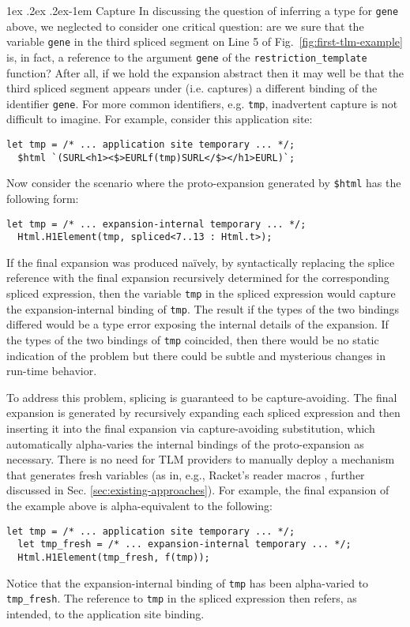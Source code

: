 \documentclass[acmsmall]{acmart}
\makeatletter
\renewcommand{\subsubsection}{%
  \@startsection{subsubsection}{3}%
  {\z@}{1ex \@plus .2ex \@minus .2ex}{-1em}%
  {\normalfont\normalsize\bfseries}%
}
\newcommand{\li}[1]{\lstinline[basicstyle=\ttfamily\fontsize{9pt}{1em}\selectfont]{#1}}
\makeatother
\begin{document}
\subsubsection{Capture}
In discussing the question of inferring a type for \li{gene} above, we neglected to consider one critical question: are we sure that the variable \li{gene} in the third spliced segment on Line 5 of Fig.~\ref{fig:first-tlm-example} is, in fact, a reference to the argument \li{gene} of the \li{restriction_template} function? After all, if we hold the expansion abstract then it may well be that the third spliced segment appears under (i.e. captures) a different binding of the identifier \li{gene}. For more common identifiers, e.g. \li{tmp}, inadvertent capture is not difficult to imagine. For example, consider this application site:
\begin{lstlisting}[numbers=none]
  let tmp = /* ... application site temporary ... */;
  $html `(SURL<h1><$>EURLf(tmp)SURL</$></h1>EURL)`;
\end{lstlisting}
Now consider the scenario where the proto-expansion generated by \li{$html} has the following form:
\begin{lstlisting}[numbers=none]
  let tmp = /* ... expansion-internal temporary ... */;
  Html.H1Element(tmp, spliced<7..13 : Html.t>);
\end{lstlisting}
If the final expansion was produced na\"ively, by syntactically replacing the splice reference with the final expansion recursively determined for the corresponding spliced expression, then the  variable \li{tmp} in the spliced expression would capture the expansion-internal binding of \li{tmp}. The result if the types of the two bindings differed would be a type error exposing the internal details of the expansion. If the types of the two bindings of \li{tmp} coincided, then there would be no static indication of the problem but there could be subtle and mysterious changes in run-time behavior. %

To address this problem, splicing is guaranteed to be capture-avoiding. The final expansion is generated by recursively expanding each spliced expression and then inserting it into the final expansion via capture-avoiding substitution, which automatically alpha-varies the internal bindings of the proto-expansion as necessary. There is no need for TLM providers to manually deploy a mechanism that generates fresh variables (as in, e.g., Racket's reader macros \cite{Flatt:2012:CLR:2063176.2063195}, further discussed in Sec. \ref{sec:existing-approaches}). For example, the final expansion of the example above is alpha-equivalent to the following:
\begin{lstlisting}[numbers=none]
  let tmp = /* ... application site temporary ... */; 
  let tmp_fresh = /* ... expansion-internal temporary ... */;
  Html.H1Element(tmp_fresh, f(tmp));
\end{lstlisting}
Notice that the expansion-internal binding of \li{tmp} has been alpha-varied to \li{tmp_fresh}. The reference to \li{tmp} in the spliced expression then refers, as intended, to the application site binding. 
\end{document}
